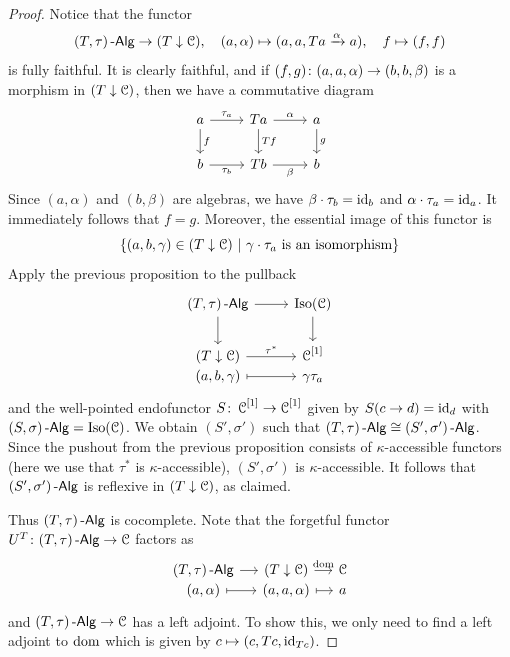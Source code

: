 \documentclass[a4paper,11pt,oneside,openany]{scrbook}
\begin{document}
\begin{proof}
	Notice that the functor
	\begin{displaymath}
		(T,\tau)\operatorname{-\mathsf{Alg}} \to (T \downarrow \operatorname{\mathcal{C}}), \quad (a,\alpha) \mapsto (a,a,Ta \xrightarrow{\alpha} a), \quad f \mapsto (f,f)
	\end{displaymath}
	is fully faithful.
	It is clearly faithful, and if $ (f,g)\colon (a,a,\alpha) \to (b,b,\beta) $
	is a morphism in $ (T \downarrow \operatorname{\mathcal{C}}) $, then we have a commutative diagram
	\begin{displaymath}
		\begin{tikzcd}
			a \arrow[d,"f"]\arrow[r, "\tau_a"]& Ta \arrow[d, "Tf"] \arrow[r, "\alpha"] & a\arrow[d, "g"]\\
			b\arrow[r,"\tau_b"'] & Tb \arrow[r, "\beta"']& b
		\end{tikzcd}
	\end{displaymath}
	Since $(a,\alpha)$ and $(b,\beta)$ are algebras, we have
    $\beta\cdot\tau_b=\operatorname{id}_b$ and $\alpha\cdot\tau_a=\operatorname{id}_a$.
	It immediately follows that $ f = g $.
	Moreover, the essential image of this functor is
	\begin{displaymath}
		\{(a,b,\gamma)\in (T\downarrow\C)\ |\ \gamma\cdot\tau_a \text{ is an isomorphism}\}
	\end{displaymath}
	Apply the previous proposition to the pullback
	\begin{displaymath}
		\begin{tikzcd}
			(T,\tau)\Alg \arrow[d]\arrow[r] & \operatorname{Iso}(\C) \arrow[d]\\
			(T\downarrow\C) \arrow[r, "\tau^*"] & \C^{[1]}\\[-2.1em]
			(a,b,\gamma)\arrow[r, mapsto] & \gamma\tau_a
		\end{tikzcd}
	\end{displaymath}
	and the well-pointed endofunctor $ S\colon \operatorname{\mathcal{C}}^{[1]} \to \operatorname{\mathcal{C}}^{[1]} $ given by $
    S(c\to d) = \operatorname{id}_{d} $ with $ (S,\sigma)\operatorname{-\mathsf{Alg}} = \operatorname{Iso}(\operatorname{\mathcal{C}}) $.
	We obtain $ (S',\sigma') $ such that $ (T,\tau)\operatorname{-\mathsf{Alg}} \cong (S',\sigma')\operatorname{-\mathsf{Alg}} $.
	Since the pushout from the previous proposition consists of $ \kappa
    $-accessible functors (here we use that $ \tau^* $ is $ \kappa
    $-accessible), $ (S',\sigma') $ is $ \kappa $-accessible.
	It follows that $ (S',\sigma')\operatorname{-\mathsf{Alg}} $ is reflexive in $ (T\downarrow\operatorname{\mathcal{C}}) $, as claimed.

	Thus $ (T,\tau)\operatorname{-\mathsf{Alg}} $ is cocomplete.
	Note that the forgetful functor $ U^T \colon (T,\tau)\operatorname{-\mathsf{Alg}} \to \operatorname{\mathcal{C}} $ factors as
	\begin{displaymath}
		\begin{tikzcd}[column sep = small]
			(T,\tau)\Alg \arrow[r]& (T\downarrow\C)\arrow[r,"\text{dom}"] & \C  \\[-2.1em]
			(a,\alpha) \arrow[r,mapsto] & (a,a,\alpha) \arrow[r,mapsto] & a
		\end{tikzcd}
	\end{displaymath}
	and $ (T,\tau)\operatorname{-\mathsf{Alg}} \to \operatorname{\mathcal{C}} $ has a left adjoint.
	To show this, we only need to find a left adjoint to $ \operatorname{dom} $ which is given
    by $ c \mapsto (c,Tc, \operatorname{id}_{Tc}) $.
\end{proof}
\end{document}

